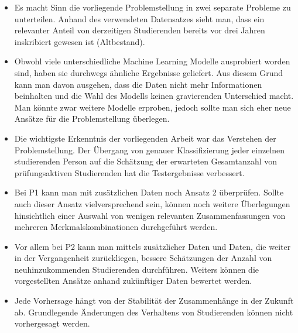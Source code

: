 \begin{itemize}
    \item Es macht Sinn die vorliegende Problemstellung in zwei separate Probleme zu unterteilen. Anhand des verwendeten Datensatzes sieht man, dass
          ein relevanter Anteil von derzeitigen Studierenden bereits vor drei Jahren inskribiert gewesen ist (Altbestand).

    \item Obwohl viele unterschiedliche Machine Learning Modelle ausprobiert worden sind, haben sie durchwegs \"ahnliche Ergebnisse geliefert.
          Aus diesem Grund kann man davon ausgehen, dass die Daten nicht mehr Informationen beinhalten und die Wahl des Modells keinen gravierenden Unterschied macht.
          Man k\"onnte zwar weitere Modelle erproben, jedoch sollte man sich eher neue Ans\"atze f\"ur die Problemstellung \"uberlegen.

    \item Die wichtigste Erkenntnis der vorliegenden Arbeit war das Verstehen der Problemstellung. Der \"Ubergang von genauer Klassifizierung jeder einzelnen
          studierenden Person auf die Sch\"atzung der erwarteten Gesamtanzahl von pr\"ufungsaktiven Studierenden hat die Testergebnisse verbessert.

    \item Bei P1 kann man mit zus\"atzlichen Daten noch Ansatz 2 \"uberpr\"ufen. Sollte auch dieser Ansatz vielversprechend sein, k\"onnen noch weitere
          \"Uberlegungen hinsichtlich einer Auswahl von wenigen relevanten Zusammenfassungen von mehreren Merkmalskombinationen durchgef\"uhrt werden.

    \item Vor allem bei P2 kann man mittels zus\"atzlicher Daten und Daten, die weiter in der Vergangenheit zur\"uckliegen, bessere Sch\"atzungen der
          Anzahl von neuhinzukommenden Studierenden durchf\"uhren. Weiters k\"onnen die vorgestellten Ans\"atze anhand zuk\"unftiger Daten bewertet werden.

    \item Jede Vorhersage h\"angt von der Stabilit\"at der Zusammenh\"ange in der Zukunft ab. Grundlegende \"Anderungen des Verhaltens von Studierenden
          k\"onnen nicht vorhergesagt werden.


\end{itemize}